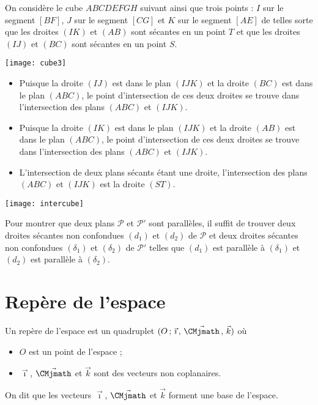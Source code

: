 \documentclass[11pt,fleqn, openany]{book} %
\begin{document}
\begin{example}On considère le cube $ABCDEFGH$ suivant ainsi que trois points : $I$ sur le segment $[BF]$, $J$ sur le segment $[CG]$ et $K$ sur le segment $[AE]$  de telles sorte que les droites $(IK)$ et $(AB)$ sont sécantes en un point $T$ et que les droites $(IJ)$ et $(BC)$ sont sécantes en un point $S$.

\begin{center}
\texttt{[image: cube3]}
\end{center}


\begin{itemize}
\item Puisque la droite $(IJ)$ est dans le plan $(IJK)$ et la droite $(BC)$ est dans le plan $(ABC)$, le point d'intersection de ces deux droites se trouve dans l'intersection des plans $(ABC)$ et $(IJK)$.
\item Puisque la droite $(IK)$ est dans le plan $(IJK)$ et la droite $(AB)$ est dans le plan $(ABC)$, le point d'intersection de ces deux droites se trouve dans l'intersection des plans $(ABC)$ et $(IJK)$.
\item L'intersection de deux plans sécants étant une droite, l'intersection des plans $(ABC)$ et $(IJK)$ est la droite $(ST)$.
\end{itemize}

\begin{center}
\texttt{[image: intercube]}
\end{center}
 \vspace{-1cm}\end{example}

\begin{proposition}Pour montrer que deux plans $\mathcal{P}$ et $\mathcal{P}'$ sont parallèles, il suffit de trouver deux droites sécantes non confondues $(d_1)$ et $(d_2)$ de $\mathcal{P}$ et deux droites sécantes non confondues $(\delta_1)$ et $(\delta_2)$ de $\mathcal{P}'$ telles que $(d_1)$ est parallèle à $(\delta_1)$ et $(d_2)$ est parallèle à $(\delta_2)$.\end{proposition}

\section{Repère de l'espace}

\begin{definition}Un repère de l'espace est un quadruplet $\Oijk$ où
\begin{itemize}
\item $O$ est un point de l'espace ;
\item $\vec{\imath}$, $\vec {\CMjmath}$ et $\vec k$ sont des vecteurs non coplanaires.
\end{itemize}
On dit que les vecteurs $\vec{\imath}$, $\vec {\CMjmath}$ et $\vec k$ forment une base de l'espace.\end{definition}
\end{document}
